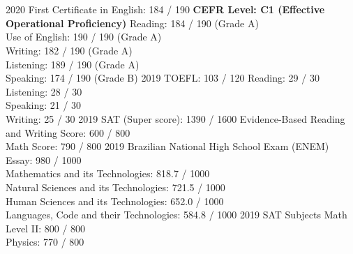 \documentclass{cv}
\begin{document}
    \section*{}
        \begin{entrylist}
            \entry
                {2020}
                {First Certificate in English: 184 / 190}
                {\textbf{CEFR Level: C1 (Effective Operational     Proficiency)}}
                {Reading: 184 / 190 (Grade A)\\ Use of English: 190 / 190 (Grade A)\\ Writing: 182 / 190 (Grade A)\\ Listening: 189 / 190 (Grade A)\\ Speaking: 174 / 190 (Grade B)}
            \entry
                {2019}
                {TOEFL: 103 / 120} 
                {}
                {Reading: 29 / 30\\ Listening: 28 / 30    \\ Speaking: 21 / 30\\ Writing: 25 / 30}
            \entry
                {2019}
                {SAT (Super score): 1390 / 1600} 
                {}
                {Evidence-Based Reading and Writing Score: 600 / 800\\ Math Score: 790 / 800}
            \entry
                {2019}
                {Brazilian National High School Exam (ENEM)}
                {}
                {Essay: 980 / 1000\\ Mathematics and its Technologies: 818.7 / 1000\\ Natural Sciences and its Technologies: 721.5 / 1000\\ Human Sciences and its Technologies: 652.0 / 1000\\ Languages, Code and their Technologies: 584.8 / 1000}
            \entry
                {2019}
                {SAT Subjects}
                {}
                {Math Level II: 800 / 800\\ Physics: 770 / 800}
        \end{entrylist}
\end{document}
